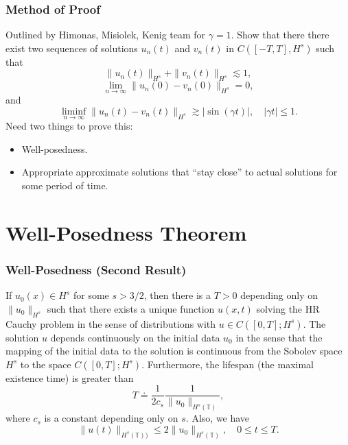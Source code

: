 \documentclass{beamer}
\newcommand{\ci}{\mathbb{T}}
\begin{document}
\begin{frame}
	\frametitle{Method of Proof}
Outlined by Himonas, Misiolek, Kenig team for $\gamma =1$. 
Show that there there exist two sequences of solutions 
$u_n(t)$
and $v_n(t)$ in $C([-T, T], H^s)$ such that
%
%
%
%
\begin{equation*}
\label{h-s-bdd}
\| u_n(t)  \|_{H^s}
+
\| v_n(t)  \|_{H^s}
\lesssim
1,
\end{equation*}
%
%
%
%
%
\begin{equation*}
\label{zero-limit-at-0}
\lim_{n\to\infty}
\|
u_n(0)
-
v_n(0)
\|_{H^s}
=
0,
\end{equation*}
%
%
%
%
and
%
%
%
%
\begin{equation*}
\label{bdd-away-from-0}
\liminf_{n\to\infty}
\|
u_n(t)
-
v_n(t)
\|_{H^s}
\gtrsim
|\sin ( \gamma t)|,
\quad
| \gamma t|\le 1.
\end{equation*}%
%
%
%
\pause
Need two things to prove this:
\begin{itemize}
\item{} Well-posedness.
 \item{} Appropriate approximate solutions that ``stay close'' to actual solutions for some period of time.
\end{itemize}
\end{frame}
%
\section{Well-Posedness Theorem}
\begin{frame}
	\frametitle{Well-Posedness (Second Result)}
\begin{theorem}
\label{hr-wp}
If $u_0(x) \in  H^s$ for some $s >3/2$,  then there is  a $T>0$
depending only on  $\|u_0\|_{H^s}$ such that there exists a unique
function $u(x, t)$ solving  the HR Cauchy problem
in the sense of distributions with  $u \in C([0, T]; H^s)$.
The solution $u$ depends continuously on the initial data $u_0$
in the sense that the mapping of the initial data to the solution 
is continuous from the Sobolev space $H^s$ to the space $C([0, T]; H^s)$.
Furthermore, the  lifespan (the maximal existence time)
 is greater than 
%
     \begin{equation*}
   T
   \doteq
   \frac{1}{2c_s}
   \frac{1}{\|u_0 \|_{H^s(\ci)}},
 \end{equation*}
%
where $c_s$  is a constant depending only on $s$.
Also, we have 
%
  \begin{equation*}
   \label{u-u0-Hs-bound}
\|u(t)\|_{H^s(\ci))}
  \le
  2
  \|u_0 \|_{H^s(\ci)},
  \quad
  0\le t \le T.
   \end{equation*}
\end{theorem}
\end{frame}
%
%
%
\end{document}
